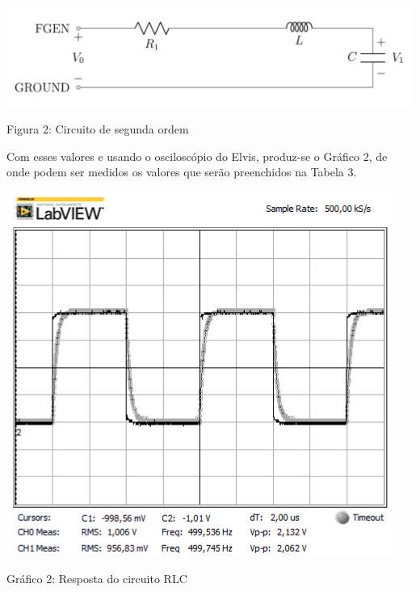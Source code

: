 \documentclass[a4 paper]{article}
\begin{document}
\begin{table}[h]
\centering
\includegraphics[scale=0.3]{figuras/figura3}
\end{table}

\begin{center}
Figura 2: Circuito de segunda ordem
\end{center}


Com esses valores e usando o osciloscópio do Elvis, produz-se o Gráfico 2, de onde podem ser medidos os valores que serão preenchidos na Tabela 3. 


\begin{table}[h]
\centering
\includegraphics[scale=0.6]{rgadicoas/rgadicoa2}
\end{table}

\begin{center}
Gráfico 2: Resposta do circuito RLC
\end{center}

\end{document}
